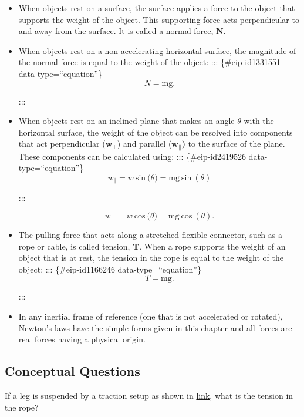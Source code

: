 \documentclass[
]{book}
\begin{document}
\begin{itemize}
\item
  When objects rest on a surface, the surface applies a force to the
  object that supports the weight of the object. This supporting force
  acts perpendicular to and away from the surface. It is called a
  normal force, \(\textbf{N}{}\).
\item
  When objects rest on a non-accelerating horizontal surface, the
  magnitude of the normal force is equal to the weight of the object:
  ::: \{\#eip-id1331551 data-type=``equation''\}
  \[{N = \text{mg}}.\]

  :::
\item
  When objects rest on an inclined plane that makes an angle
  \(\theta{}\) with the horizontal surface, the weight of the object can
  be resolved into components that act perpendicular
  (\(\textbf{w}_{\bot}{}\)) and parallel
  (\(\textbf{w}_{\parallel}{}\)\textbf{)} to the surface of the plane. These
  components can be calculated using:
  ::: \{\#eip-id2419526 data-type=``equation''\}
  \[{{w_{\parallel} = w\ }\text{sin}\ (\theta{) = \text{mg}}\ \text{sin}\ (\theta)}{}\]

  :::

  \leavevmode{}%
  \[{{w_{\bot} = w}\ \text{cos}\ (\theta{) = {\text{mg}\ }}\text{cos}\ (\theta)}.\]
\item
  The pulling force that acts along a stretched flexible connector,
  such as a rope or cable, is called tension, \(\textbf{T}{}\). When a
  rope supports the weight of an object that is at rest, the tension
  in the rope is equal to the weight of the object:
  ::: \{\#eip-id1166246 data-type=``equation''\}
  \[{T = \text{mg}}.\]

  :::
\item
  In any inertial frame of reference (one that is not accelerated or
  rotated), Newton's laws have the simple forms given in this chapter
  and all forces are real forces having a physical origin.
\end{itemize}

\hypertarget{fs-id1280043}{}
\hypertarget{conceptual-questions-15}{%
\subsection{Conceptual Questions}\label{conceptual-questions-15}}

\hypertarget{fs-id2656274}{}
\leavevmode{}%
If a leg is suspended by a traction setup as shown in
\protect\hyperlink{import-auto-id1436486}{link}, what is the
tension in the rope?
\end{document}

